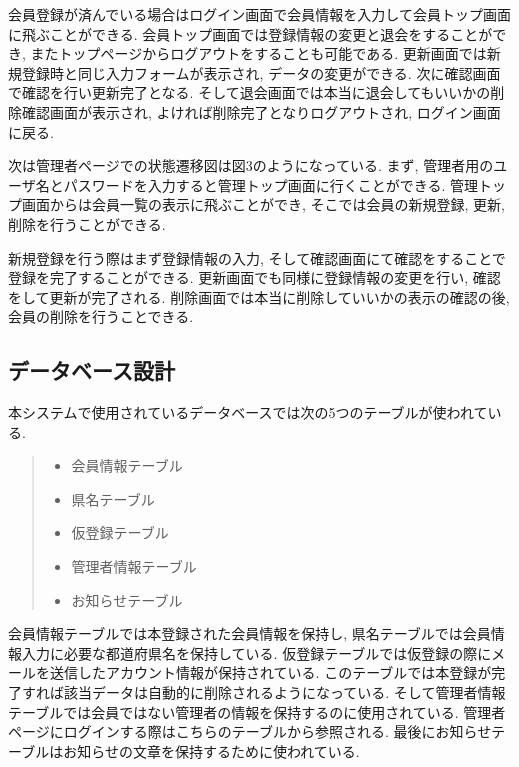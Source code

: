 \documentclass[submit,techrep]{ipsj}
\begin{document}
会員登録が済んでいる場合はログイン画面で会員情報を入力して会員トップ画面に飛ぶことができる. 会員トップ画面では登録情報の変更と退会をすることができ, またトップページからログアウトをすることも可能である. 
更新画面では新規登録時と同じ入力フォームが表示され, データの変更ができる. 次に確認画面で確認を行い更新完了となる. 
そして退会画面では本当に退会してもいいかの削除確認画面が表示され, よければ削除完了となりログアウトされ, ログイン画面に戻る. 

次は管理者ページでの状態遷移図は図3のようになっている. まず, 管理者用のユーザ名とパスワードを入力すると管理トップ画面に行くことができる. 管理トップ画面からは会員一覧の表示に飛ぶことができ, そこでは会員の新規登録, 更新, 削除を行うことができる. 

新規登録を行う際はまず登録情報の入力, そして確認画面にて確認をすることで登録を完了することができる. 更新画面でも同様に登録情報の変更を行い, 確認をして更新が完了される. 削除画面では本当に削除していいかの表示の確認の後, 会員の削除を行うことできる. 

\subsection{データベース設計}
本システムで使用されているデータベースでは次の5つのテーブルが使われている. 
\begin{quote}
 \begin{itemize}
  \item 会員情報テーブル
  \item 県名テーブル
  \item 仮登録テーブル
  \item 管理者情報テーブル
  \item お知らせテーブル
 \end{itemize}
\end{quote}
会員情報テーブルでは本登録された会員情報を保持し, 県名テーブルでは会員情報入力に必要な都道府県名を保持している.
仮登録テーブルでは仮登録の際にメールを送信したアカウント情報が保持されている. 
このテーブルでは本登録が完了すれば該当データは自動的に削除されるようになっている. そして管理者情報テーブルでは会員ではない管理者の情報を保持するのに使用されている. 管理者ページにログインする際はこちらのテーブルから参照される.
最後にお知らせテーブルはお知らせの文章を保持するために使われている.  
\end{document}
